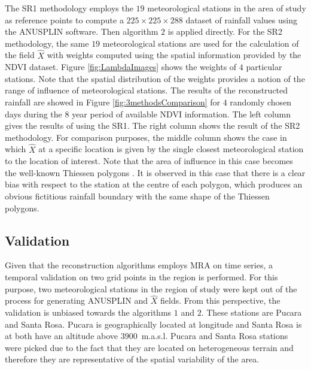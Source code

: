 {The SR1 methodology employs the $19$ meteorological stations in the area of study as reference points to compute a $225\times 225 \times 288$ dataset of rainfall values using the ANUSPLIN software. Then algorithm $2$ is applied directly. For the SR2 methodology, the same $19$ meteorological stations are used for the calculation of the field $\hat{X}$ with  weights computed using the spatial information provided by the NDVI dataset. Figure \ref{fig:LambdaImages} shows the weights of $4$ particular stations. Note that the spatial distribution of the weights provides a notion of the range of influence of meteorological stations.  The results of the reconstructed rainfall are showed in Figure \ref{fig:3methodsComparison} for $4$ randomly chosen days during the $8$ year period of available NDVI information. The left column gives  the results of using the SR1. The right column shows the result of the SR2 methodology. For 
comparison purposes, the middle column shows the case in which $\hat{X}$ at a specific location is given by the single closest meteorological station to the location of interest. Note that the area of influence in this case becomes the well-known Thiessen polygons \citep{Voronoi_1908}. It is observed in this case that there is a  clear bias with respect to the station at the centre of each 
polygon, which produces an obvious fictitious rainfall boundary with the same shape of the Thiessen polygons.  

\subsection{Validation}

Given that the reconstruction algorithms employs MRA on time series, a temporal 
validation on two grid points in the region is performed. For this 
purpose, two meteorological stations in the region of study were kept out of 
the process for generating ANUSPLIN and $\hat{X}$ fields. From this perspective, the validation is unbiased towards the algorithms $1$ and $2$. These stations are 
Pucara and Santa Rosa. Pucara is geographically located at longitude 
 and Santa Rosa is at  both have an altitude above $3900$~{m.a.s.l}. Pucara and Santa Rosa stations were picked due to the fact that they are located on heterogeneous terrain and therefore they are representative of the spatial variability of the area. 

}
